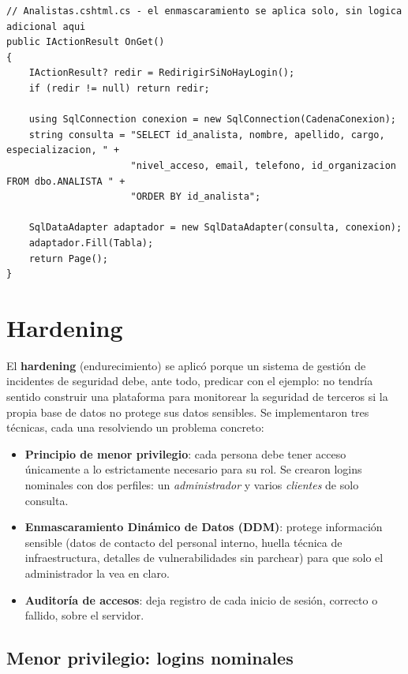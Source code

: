 \documentclass[11pt,a4paper]{article}
\begin{document}
\begin{lstlisting}[style=codestyle]
// Analistas.cshtml.cs - el enmascaramiento se aplica solo, sin logica adicional aqui
public IActionResult OnGet()
{
    IActionResult? redir = RedirigirSiNoHayLogin();
    if (redir != null) return redir;

    using SqlConnection conexion = new SqlConnection(CadenaConexion);
    string consulta = "SELECT id_analista, nombre, apellido, cargo, especializacion, " +
                      "nivel_acceso, email, telefono, id_organizacion FROM dbo.ANALISTA " +
                      "ORDER BY id_analista";

    SqlDataAdapter adaptador = new SqlDataAdapter(consulta, conexion);
    adaptador.Fill(Tabla);
    return Page();
}
\end{lstlisting}

\section{Hardening}

El \textbf{hardening} (endurecimiento) se aplicó porque un sistema de gestión de
incidentes de seguridad debe, ante todo, predicar con el ejemplo: no tendría sentido
construir una plataforma para monitorear la seguridad de terceros si la propia base
de datos no protege sus datos sensibles. Se implementaron tres técnicas, cada una
resolviendo un problema concreto:

\begin{itemize}
    \item \textbf{Principio de menor privilegio}: cada persona debe tener acceso
    únicamente a lo estrictamente necesario para su rol. Se crearon logins
    nominales con dos perfiles: un \emph{administrador} y varios
    \emph{clientes} de solo consulta.
    \item \textbf{Enmascaramiento Dinámico de Datos (DDM)}: protege información
    sensible (datos de contacto del personal interno, huella técnica de
    infraestructura, detalles de vulnerabilidades sin parchear) para que solo el
    administrador la vea en claro.
    \item \textbf{Auditoría de accesos}: deja registro de cada inicio de sesión,
    correcto o fallido, sobre el servidor.
\end{itemize}

\subsection{Menor privilegio: logins nominales}
\end{document}
